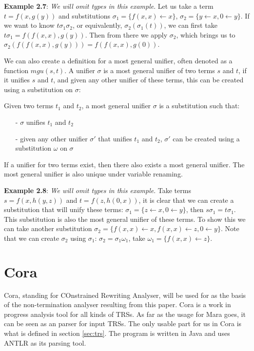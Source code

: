 \textbf{Example 2.7}: \textit{We will omit types in this example}. Let us take a term $t = f(x, g(y))$ and substitutions $\sigma_1 = \{ f(x, x) \leftarrow x\}$, $\sigma_2 = \{ y \leftarrow x, 0 \leftarrow y \}$. If we want to know $t\sigma_1\sigma_2$, or equivalently, $\sigma_2(\sigma_1(t))$, we can first take $t\sigma_1 = f(f(x, x), g(y))$. Then from there we apply $\sigma_2$, which brings us to $\sigma_2(f(f(x, x), g(y))) = f(f(x, x), g(0))$.

We can also create a definition for a most general unifier, often denoted as a function $\textit{mgu}(s, t)$. A unifier $\sigma$ is a most general unifier of two terms $s$ and $t$, if it unifies $s$ and $t$, and given any other unifier of these terms, this can be created using a substitution on $\sigma$:
\begin{definition}
Given two terms $t_1$ and $t_2$, a most general unifier $\sigma$ is a substitution such that:
\begin{itemize}
    \itemsep -.4em
    \item[-] $\sigma$ unifies $t_1$ and $t_2$
    \item[-] given any other unifier $\sigma'$ that unifies $t_1$ and $t_2$, $\sigma'$ can be created using a substitution $\omega$ on $\sigma$
\end{itemize}
\end{definition}

If a unifier for two terms exist, then there also exists a most general unifier\cite{BUSS19981}. The most general unifier is also unique under variable renaming. 

\textbf{Example 2.8}: \textit{We will omit types in this example}. Take terms $s = f(x, h(y, z))$ and $t = f(z, h(0, x))$, it is clear that we can create a substitution that will unify these terms: $\sigma_1 = \{ z \leftarrow x, 0 \leftarrow y \}$, then $s\sigma_1 = t\sigma_1$. This substitution is also the most general unifier of these terms. To show this we can take another substitution $\sigma_2 = \{ f(x, x) \leftarrow x, f(x, x) \leftarrow z, 0 \leftarrow y \}$. Note that we can create $\sigma_2$ using $\sigma_1$: $\sigma_2 = \sigma_1\omega_1$, take $\omega_1 = \{ f(x, x) \leftarrow z\}$.

\section{Cora}
Cora, standing for COnstrained Rewriting Analyser\cite{Cora2019}, will be used for as the basis of the non-termination analyser resulting from this paper. Cora is a work in progress analysis tool for all kinds of TRSs. As far as the usage for Mara goes, it can be seen as an parser for input TRSs. The only usable part for us in Cora is what is defined in section \ref{sec:trs}. The program is written in Java and uses ANTLR\cite{Parr:2013:DAR:2501720} as its parsing tool.

